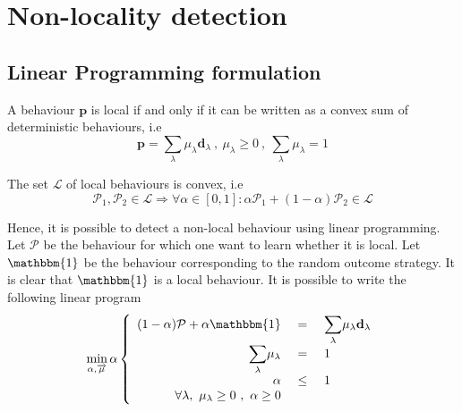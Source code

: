 \section{Non-locality detection}\label{Non-locality-det}

\subsection{Linear Programming formulation}\label{primal-LP}

\begin{proposition}
\label{convex_sum}
A behaviour $\mathbf{p}$ is local if and only if  it can be written as a convex sum of deterministic behaviours, i.e 
\begin{equation}
    \mathbf{p} = \displaystyle \sum_\lambda \mu_\lambda \mathbf{d}_\lambda \ , \ \mu_\lambda \geq 0 \ , \ \displaystyle \sum_\lambda \mu_\lambda = 1
\end{equation}
\end{proposition}

\begin{proposition}
\label{convex_sum2}
The set $\mathcal L$ of local behaviours is convex, i.e 
\begin{equation}
\mathcal P_1, \mathcal P_2  \in \mathcal L 
\Rightarrow \forall \alpha \in [0, 1] : \alpha \mathcal
P_1 + (1-\alpha) \mathcal P_2 \in \mathcal L
\end{equation}
\end{proposition}

Hence, it is possible to detect a non-local behaviour using linear programming. \\ Let $\mathcal P$ be the behaviour for which one want to learn whether it is local. Let $\mathbbm{1}$ be the behaviour corresponding to the random outcome strategy. It is clear that $\mathbbm{1}$ is a local behaviour. It is possible to write the following linear program 
\begin{equation}
    \displaystyle{\min_{\alpha,\overrightarrow{\mu}}} \, \alpha  \\

\left\{
\begin{array}{rcl}
 (1-\alpha) \mathcal{P}+ \alpha \mathbbm{1} &\ = \ & \displaystyle{\sum_\lambda} \mu_\lambda \mathbf{d_\lambda} \\
\displaystyle{\sum_\lambda} \mu_\lambda &\ = \ & 1  \\
\alpha  &\ \leq \ & 1 \\
\forall \lambda,\ \mu_\lambda \geq 0\ ,\ \alpha \geq 0  
\end{array}
\right.
\label{eq:primal}

\end{equation}


